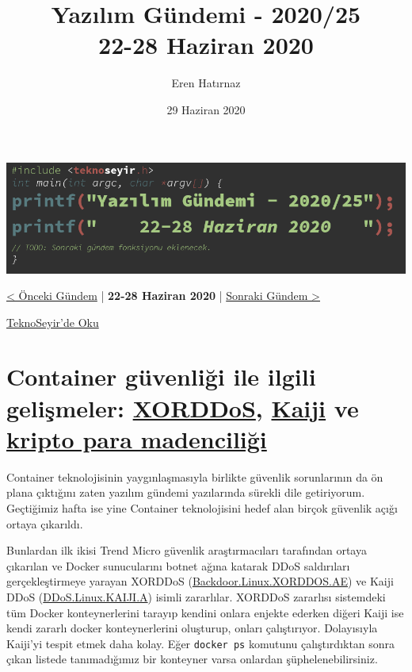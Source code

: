 \documentclass[11pt]{article}
\author{Eren Hatırnaz}
\date{29 Haziran 2020}
\title{Yazılım Gündemi - 2020/25\\\medskip
\large 22-28 Haziran 2020}
\begin{document}
\maketitle
\tableofcontents \clearpage\shorthandoff{=}

\begin{center}
\includegraphics[width=.9\linewidth]{gorseller/yazilim-gundemi-banner.png}
\end{center}

\begin{center}
\href{../24/yazilim-gundemi-2020-24.pdf}{< Önceki Gündem} | \textbf{22-28 Haziran 2020} | \href{../26/yazilim-gundemi-2020-26.pdf}{Sonraki Gündem >}

\href{https://teknoseyir.com/blog/yazilim-gundemi-2020-25}{TeknoSeyir'de Oku}
\end{center}

\section{Container güvenliği ile ilgili gelişmeler: \href{https://blog.trendmicro.com/trendlabs-security-intelligence/xorddos-kaiji-botnet-malware-variants-target-exposed-docker-servers/}{XORDDoS}, \href{https://intezer.com/blog/research/kaiji-new-chinese-linux-malware-turning-to-golang/}{Kaiji} ve \href{https://unit42.paloaltonetworks.com/cryptojacking-docker-images-for-mining-monero/}{kripto para madenciliği}}
\label{sec:orgd7713ea}
Container teknolojisinin yaygınlaşmasıyla birlikte güvenlik sorunlarının da ön
plana çıktığını zaten yazılım gündemi yazılarında sürekli dile getiriyorum.
Geçtiğimiz hafta ise yine Container teknolojisini hedef alan birçok güvenlik
açığı ortaya çıkarıldı.

Bunlardan ilk ikisi Trend Micro güvenlik araştırmacıları tarafından ortaya
çıkarılan ve Docker sunucularını botnet ağına katarak DDoS saldırıları
gerçekleştirmeye yarayan XORDDoS (\href{https://www.trendmicro.com/vinfo/us/threat-encyclopedia/malware/Backdoor.Linux.XORDDOS.AE}{Backdoor.Linux.XORDDOS.AE}) ve Kaiji DDoS
(\href{https://www.trendmicro.com/vinfo/us/threat-encyclopedia/malware/DDoS.Linux.KAIJI.A}{DDoS.Linux.KAIJI.A}) isimli zararlılar. XORDDoS zararlısı sistemdeki tüm
Docker konteynerlerini tarayıp kendini onlara enjekte ederken diğeri Kaiji ise
kendi zararlı docker konteynerlerini oluşturup, onları çalıştırıyor.
Dolayısıyla Kaiji'yi tespit etmek daha kolay. Eğer \texttt{docker ps} komutunu
çalıştırdıktan sonra çıkan listede tanımadığımız bir konteyner varsa onlardan
şüphelenebilirsiniz.
\end{document}
